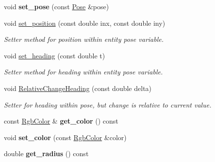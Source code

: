 \begin{DoxyCompactItemize}
\item 
void {\bfseries set\+\_\+pose} (const \hyperlink{structPose}{Pose} \&pose)\hypertarget{classArenaEntity_a6eb76e5f1b5949314c12cc512d6930ae}{}\label{classArenaEntity_a6eb76e5f1b5949314c12cc512d6930ae}

\item 
void \hyperlink{classArenaEntity_a3136704edf07c24639319abf5c28dac0}{set\+\_\+position} (const double inx, const double iny)\hypertarget{classArenaEntity_a3136704edf07c24639319abf5c28dac0}{}\label{classArenaEntity_a3136704edf07c24639319abf5c28dac0}

\begin{DoxyCompactList}\small\item\em Setter method for position within entity pose variable. \end{DoxyCompactList}\item 
void \hyperlink{classArenaEntity_ac1cc3c6997bc7a9573128fc5ded9eb72}{set\+\_\+heading} (const double t)\hypertarget{classArenaEntity_ac1cc3c6997bc7a9573128fc5ded9eb72}{}\label{classArenaEntity_ac1cc3c6997bc7a9573128fc5ded9eb72}

\begin{DoxyCompactList}\small\item\em Setter method for heading within entity pose variable. \end{DoxyCompactList}\item 
void \hyperlink{classArenaEntity_a4c4bd7f5ffb778979303c33cb3bc9986}{Relative\+Change\+Heading} (const double delta)
\begin{DoxyCompactList}\small\item\em Setter for heading within pose, but change is relative to current value. \end{DoxyCompactList}\item 
const \hyperlink{structRgbColor}{Rgb\+Color} \& {\bfseries get\+\_\+color} () const \hypertarget{classArenaEntity_a9ba62519f6c6294373fdc8488713b4e0}{}\label{classArenaEntity_a9ba62519f6c6294373fdc8488713b4e0}

\item 
void {\bfseries set\+\_\+color} (const \hyperlink{structRgbColor}{Rgb\+Color} \&color)\hypertarget{classArenaEntity_a1ac33beda7462ac5c7f4f71a70d3fb10}{}\label{classArenaEntity_a1ac33beda7462ac5c7f4f71a70d3fb10}

\item 
double {\bfseries get\+\_\+radius} () const \hypertarget{classArenaEntity_a5a2b834ad654f42785c3073c25a0fea8}{}\label{classArenaEntity_a5a2b834ad654f42785c3073c25a0fea8}


\end{DoxyCompactItemize}
